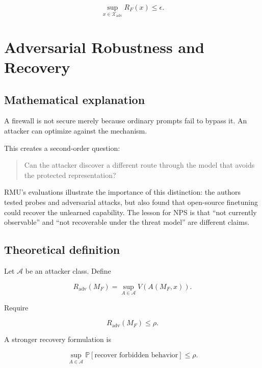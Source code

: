 \documentclass[11pt]{article}
\newcommand{\X}{\mathcal{X}}
\newcommand{\Prob}{\mathbb{P}}
\begin{document}
\begin{equation}
\boxed{
\sup_{x\in\X_{\mathrm{adv}}}
R_F(x)
\leq\epsilon.
}
\end{equation}

\section{Adversarial Robustness and Recovery}

\subsection*{Mathematical explanation}

A firewall is not secure merely because ordinary prompts fail to bypass it.
An attacker can optimize against the mechanism.

This creates a second-order question:

\begin{quote}
Can the attacker discover a different route through the model that avoids the
protected representation?
\end{quote}

RMU's evaluations illustrate the importance of this distinction: the authors
tested probes and adversarial attacks, but also found that open-source
finetuning could recover the unlearned capability. The lesson for NPS is that
``not currently observable'' and ``not recoverable under the threat model''
are different claims.

\subsection*{Theoretical definition}

Let $\mathcal A$ be an attacker class. Define

\begin{equation}
R_{\mathrm{adv}}(M_F)
=
\sup_{A\in\mathcal A}
V(A(M_F,x)).
\end{equation}

Require

\begin{equation}
\boxed{
R_{\mathrm{adv}}(M_F)\leq\rho.
}
\end{equation}

A stronger recovery formulation is

\begin{equation}
\sup_{A\in\mathcal A}
\Prob\left[
\text{recover forbidden behavior}
\right]
\leq\rho.
\end{equation}
\end{document}
